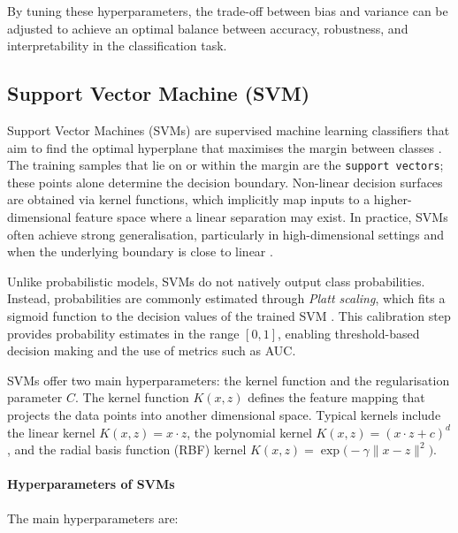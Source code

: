 By tuning these hyperparameters, the trade-off between bias and variance can be adjusted to achieve an optimal balance between accuracy, robustness, and interpretability in the classification task.

\subsection{Support Vector Machine (SVM)}\label{subsec:method-svm}

Support Vector Machines (SVMs) are supervised machine learning classifiers that aim to find the optimal hyperplane that maximises the margin between classes \citep{Cortes1995}. The training samples that lie on or within the margin are the \texttt{support vectors}; these points alone determine the decision boundary. Non-linear decision surfaces are obtained via kernel functions, which implicitly map inputs to a higher-dimensional feature space where a linear separation may exist. In practice, SVMs often achieve strong generalisation, particularly in high-dimensional settings and when the underlying boundary is close to linear \citep{chang2011guide}.

Unlike probabilistic models, SVMs do not natively output class probabilities. Instead, probabilities are commonly estimated through \textit{Platt scaling}, which fits a sigmoid function to the decision values of the trained SVM \citep{Platt1999}. This calibration step provides probability estimates in the range $[0,1]$, enabling threshold-based decision making and the use of metrics such as AUC.

SVMs offer two main hyperparameters: the kernel function and the regularisation parameter $C$. The kernel function $K(x,z)$ defines the feature mapping that projects the data points into another dimensional space. Typical kernels include the linear kernel $K(x,z)=x \cdot z$, the polynomial kernel $K(x,z)=(x \cdot z + c)^d$, and the radial basis function (RBF) kernel $K(x,z)=\exp\!\big(-\gamma \lVert x-z\rVert^2\big)$.\paragraph{Hyperparameters of SVMs} The main hyperparameters are:

